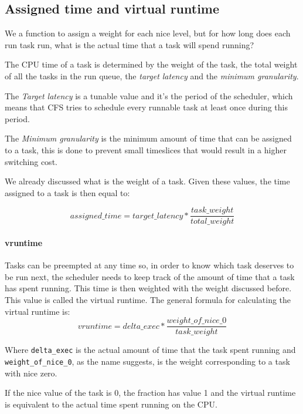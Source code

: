 \documentclass[10pt]{book}
\begin{document}
\subsection{Assigned time and virtual runtime}

We a function to assign a weight for each nice level, but for how long does each run task run, what is the actual time that a task will spend running?


The CPU time of a task is determined by the weight of the task, the total weight of all the tasks in the run queue, the \textit{target latency} and the \textit{minimum granularity}. 

The \textit{Target latency} is a tunable value and it's the period of the scheduler, which means that CFS tries to schedule every runnable task at least once during this period. 

The \textit{Minimum granularity} is the minimum amount of time that can be assigned to a task, this is done to prevent small timeslices that would result in a higher switching cost.

We already discussed what is the weight of a task. Given these values, the time assigned to a task is then equal to: 

\begin{equation} \label{eq:2.4}
    assigned\_time = target\_latency * \frac{task\_weight}{total\_weight}
\end{equation}

\paragraph{vruntime}

Tasks can be preempted at any time so, in order to know which task deserves to be run next, the scheduler needs to keep track of the amount of time that a task has spent running. This time is then weighted with the weight discussed before. This value is called the virtual runtime. The general formula for calculating the virtual runtime is:
\begin{equation}
    vruntime = delta\_exec * \frac{weight\_of\_nice\_0}{task\_weight}
\end{equation}

Where \verb|delta_exec| is the actual amount of time that the task spent running and \verb|weight_of_nice_0|, as the name suggests, is the weight corresponding to a task with nice zero.

If the nice value of the task is 0, the fraction has value 1 and the virtual runtime is equivalent to the actual time spent running on the CPU.
\end{document}
